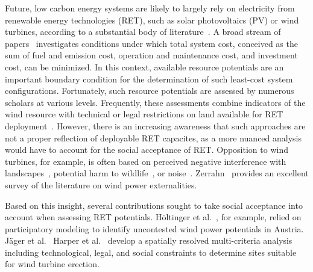 \documentclass[review, 3p, times]{elsarticle} %
\begin{document}


    Future, low carbon energy systems are likely to largely rely on electricity from renewable energy technologies
    (RET), such as solar photovoltaics (PV) or wind turbines, according to a substantial body of
    literature~\citep[e.g.][]{Becker2014,Delucchi2011,Fernandes2014,Gils2017,Jacobson2011,Schmidt2016}.
    A broad stream of papers~\citep[e.g.][]{Brown2018,Rodriguez2015,Schlachtberger2018,Scholz2017} investigates
    conditions under which total system cost, conceived as the sum of fuel and emission cost, operation and maintenance
    cost, and investment cost, can be minimized.
    In this context, available resource potentials are an important boundary condition for the determination of such
    least-cost system configurations.
    Fortunately, such resource potentials are assessed by numerous scholars at various levels.
    Frequently, these assessments combine indicators of the wind resource with technical or legal restrictions on land
    available for RET deployment~\citep[e.g.][]{Bosch2017,McKenna2015,Ryberg2020}.
    However, there is an increasing awareness that such approaches are not a proper reflection of deployable RET
    capacites, as a more nuanced analysis would have to account for the social acceptance of RET.
    Opposition to wind turbines, for example, is often based on perceived negative interference with
    landscapes~\cite{Mattmann2016}, potential harm to wildlife~\cite{Loss2013, Voigt2015, Wang2015}, or
    noise~\cite{Wang2015a}.
    Zerrahn~\cite{Zerrahn2017} provides an excellent survey of the literature on wind power externalities.

    Based on this insight, several contributions sought to take social acceptance into account when assessing RET
    potentials.
    Höltinger et al.\ \cite{Hoeltinger2016}, for example, relied on participatory modeling to identify uncontested wind
    power potentials in Austria.
    Jäger et al.\ \cite{Jaeger2016} 
    Harper et al.\ \cite{Harper2019} develop a spatially resolved multi-criteria analysis including technological, legal,
    and social constraints to determine sites suitable for wind turbine erection.
\end{document}

